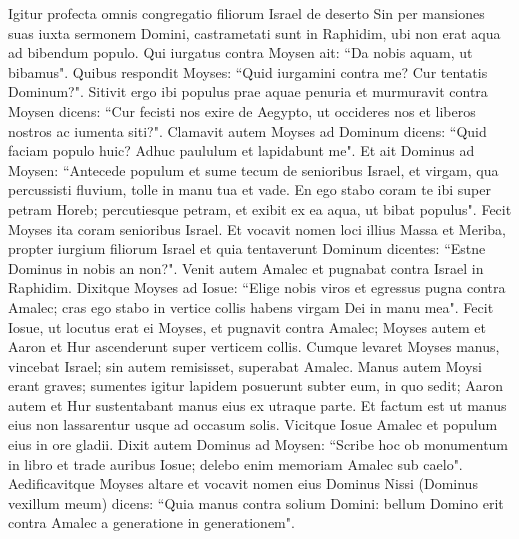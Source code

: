 \begin{biblechapter}  
\verse Igitur profecta omnis congregatio filiorum Israel de deserto Sin per mansiones suas iuxta sermonem Domini, castrametati sunt in Raphidim, ubi non erat aqua ad bibendum populo. 
\verse Qui iurgatus contra Moysen ait: “Da nobis aquam, ut bibamus". Quibus respondit Moyses: “Quid iurgamini contra me? Cur tentatis Dominum?". 
\verse Sitivit ergo ibi populus prae aquae penuria et murmuravit contra Moysen dicens: “Cur fecisti nos exire de Aegypto, ut occideres nos et liberos nostros ac iumenta siti?". 
\verse Clamavit autem Moyses ad Dominum dicens: “Quid faciam populo huic? Adhuc paululum et lapidabunt me".  
\verse Et ait Dominus ad Moysen: “Antecede populum et sume tecum de senioribus Israel, et virgam, qua percussisti fluvium, tolle in manu tua et vade. 
\verse En ego stabo coram te ibi super petram Horeb; percutiesque petram, et exibit ex ea aqua, ut bibat populus". Fecit Moyses ita coram senioribus Israel. 
\verse Et vocavit nomen loci illius Massa et Meriba, propter iurgium filiorum Israel et quia tentaverunt Dominum dicentes: “Estne Dominus in nobis an non?". 
\verse Venit autem Amalec et pugnabat contra Israel in Raphidim. 
\verse Dixitque Moyses ad Iosue: “Elige nobis viros et egressus pugna contra Amalec; cras ego stabo in vertice collis habens virgam Dei in manu mea". 
\verse Fecit Iosue, ut locutus erat ei Moyses, et pugnavit contra Amalec; Moyses autem et Aaron et Hur ascenderunt super verticem collis. 
\verse Cumque levaret Moyses manus, vincebat Israel; sin autem remisisset, superabat Amalec. 
\verse Manus autem Moysi erant graves; sumentes igitur lapidem posuerunt subter eum, in quo sedit; Aaron autem et Hur sustentabant manus eius ex utraque parte. Et factum est ut manus eius non lassarentur usque ad occasum solis. 
\verse Vicitque Iosue Amalec et populum eius in ore gladii. 
\verse Dixit autem Dominus ad Moysen: “Scribe hoc ob monumentum in libro et trade auribus Iosue; delebo enim memoriam Amalec sub caelo". 
\verse Aedificavitque Moyses altare et vocavit nomen eius Dominus Nissi (Dominus vexillum meum) 
\verse dicens: “Quia manus contra solium Domini: bellum Domino erit contra Amalec a generatione in generationem". 
\end{biblechapter}

